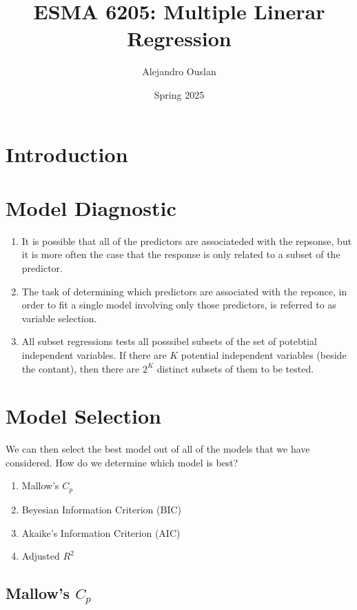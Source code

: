 \documentclass[10pt, oneside]{article}
\title{ESMA 6205: Multiple Linerar Regression}
\author{Alejandro Ouslan}
\date{Spring 2025}
\begin{document}
\maketitle
\tableofcontents

\vspace{.25in}

\section{Introduction}

\section{Model Diagnostic}
\begin{enumerate}
	\item It is possible that all of the predictors are associateded with the
	      repsonse, but it is more often the case that the response is only related to a
	      subset of the predictor.
	\item The task of determining which predictors are associated with the
	      reponce, in order to fit a single model involving only those predictors,
	      is referred to as variable selection.
	\item All subset regressions tests all posssibel subsets of the set of potebtial
	      independent variables. If there are $K$ potential independent variables
	      (beside the contant), then there are $2^K$ distinct subsets of them to be tested.
\end{enumerate}

\section{Model Selection}

We can then select the best model out of all of the models that we have considered. How
do we determine which model is best?

\begin{enumerate}
	\item Mallow's $C_p$
	\item Beyesian Information Criterion (BIC)
	\item Akaike's Information Criterion (AIC)
	\item Adjusted $R^2$
\end{enumerate}

\subsection{Mallow's $C_p$}
\end{document}
